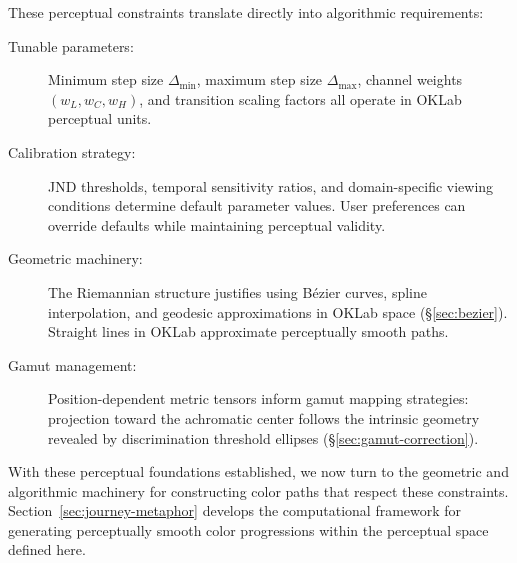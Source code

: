 These perceptual constraints translate directly into algorithmic requirements:

\begin{description}
    \item[Tunable parameters:] Minimum step size $\Delta_{\min}$, maximum step size $\Delta_{\max}$, channel weights $(w_L, w_C, w_H)$, and transition scaling factors all operate in OKLab perceptual units.
    
    \item[Calibration strategy:] JND thresholds, temporal sensitivity ratios, and domain-specific viewing conditions determine default parameter values. User preferences can override defaults while maintaining perceptual validity.
    
    \item[Geometric machinery:] The Riemannian structure justifies using Bézier curves, spline interpolation, and geodesic approximations in OKLab space (\S\ref{sec:bezier}). Straight lines in OKLab approximate perceptually smooth paths.
    
    \item[Gamut management:] Position-dependent metric tensors inform gamut mapping strategies: projection toward the achromatic center follows the intrinsic geometry revealed by discrimination threshold ellipses (\S\ref{sec:gamut-correction}).
\end{description}

With these perceptual foundations established, we now turn to the geometric and algorithmic machinery for constructing color paths that respect these constraints. Section~\ref{sec:journey-metaphor} develops the computational framework for generating perceptually smooth color progressions within the perceptual space defined here. 
